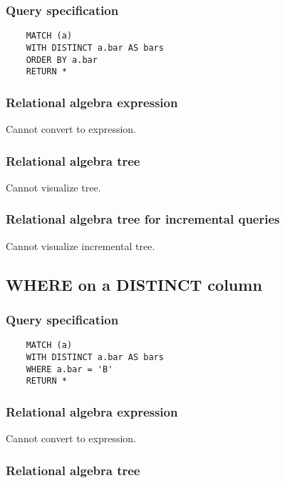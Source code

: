 	\subsubsection*{Query specification}

	\begin{lstlisting}
	MATCH (a)
	WITH DISTINCT a.bar AS bars
	ORDER BY a.bar
	RETURN *
	\end{lstlisting}


	\subsubsection*{Relational algebra expression}

	Cannot convert to expression.

	\subsubsection*{Relational algebra tree}

	Cannot visualize tree.

	\subsubsection*{Relational algebra tree for incremental queries}

	Cannot visualize incremental tree.
	\subsection{WHERE on a DISTINCT column}

	\subsubsection*{Query specification}

	\begin{lstlisting}
	MATCH (a)
	WITH DISTINCT a.bar AS bars
	WHERE a.bar = 'B'
	RETURN *
	\end{lstlisting}


	\subsubsection*{Relational algebra expression}

	Cannot convert to expression.

	\subsubsection*{Relational algebra tree}

